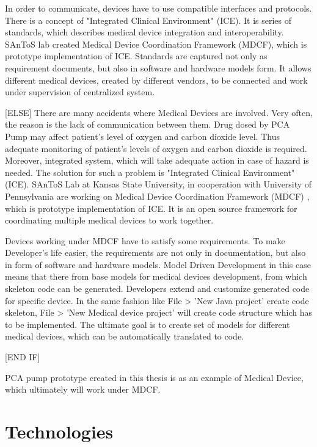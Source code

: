 In order to communicate, devices have to use compatible interfaces and protocols. There is a concept of "Integrated Clinical Environment" (ICE). It is series of standards, which describes medical device integration and interoperability. SAnToS lab created Medical Device Coordination Framework (MDCF), which is prototype implementation of ICE. Standards are captured not only as requirement documents, but also in software and hardware models form. It allows different medical devices, created by different vendors, to be connected and work under supervision of centralized system.

[ELSE]
There are many accidents where Medical Devices are involved. Very often, the reason is the lack of communication between them. Drug dosed by PCA Pump may affect patient's level of oxygen and carbon dioxide level. Thus adequate monitoring of patient's levels of oxygen and carbon dioxide is required. Moreover, integrated system, which will take adequate action in case of hazard is needed. The solution for such a problem is "Integrated Clinical Environment" (ICE). SAnToS Lab at Kansas State University, in cooperation with University of Pennsylvania are working on Medical Device Coordination Framework (MDCF) \cite{MedicalApplicationPlatforms:Paper}, which is prototype implementation of ICE. It is an open source framework for coordinating multiple medical devices to work together.

Devices working under MDCF have to satisfy some requirements. To make Developer's life easier, the requirements are not only in documentation, but also in form of software and hardware models. Model Driven Development in this case means that there from base models for medical devices development, from which skeleton code can be generated. Developers extend and customize generated code for specific device. In the same fashion like File > 'New Java project' create code skeleton, File > 'New Medical device project' will create code structure which has to be implemented. The ultimate goal is to create set of models for different medical devices, which can be automatically translated to code.

[END IF]

PCA pump prototype created in this thesis is as an example of Medical Device, which ultimately will work under MDCF.


\section{Technologies}
\label{introduction:technologies}

